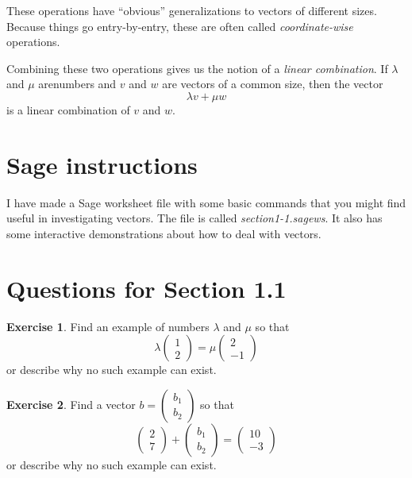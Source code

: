 \documentclass[11pt]{amsart}
\theoremstyle{definition}
\newtheorem{exercise}{Exercise}
\begin{document}
These operations have ``obvious'' generalizations to vectors of different sizes. Because things go entry-by-entry, these are often called \emph{coordinate-wise} operations.

Combining these two operations gives us the notion of a \emph{linear combination}. If $\lambda$ and $\mu$ arenumbers and $v$ and $w$ are vectors of a common size, then the vector
\[ \lambda v + \mu w \]
is a linear combination of $v$ and $w$.


\section{Sage instructions}

I have made a Sage worksheet file with some basic commands that you might find useful in investigating vectors. The file is called \emph{section1-1.sagews}. It also has some interactive demonstrations about how to deal with vectors.


\section{Questions for Section 1.1}

\begin{exercise}
Find an example of numbers $\lambda$ and $\mu$ so that
\[ \lambda \begin{pmatrix} 1 \\ 2 \end{pmatrix} = \mu \begin{pmatrix} 2 \\ -1 \end{pmatrix}\]
or describe why no such example can exist.
\end{exercise}

\begin{exercise}
Find a vector $b = \left( \begin{smallmatrix} b_1 \\ b_2 \end{smallmatrix} \right)$ so that
\[
\begin{pmatrix} 2 \\ 7 \end{pmatrix} + \begin{pmatrix} b_1 \\ b_2 \end{pmatrix} = \begin{pmatrix} 10 \\ -3 \end{pmatrix}
\]
or describe why no such example can exist.
\end{exercise}
\end{document}
